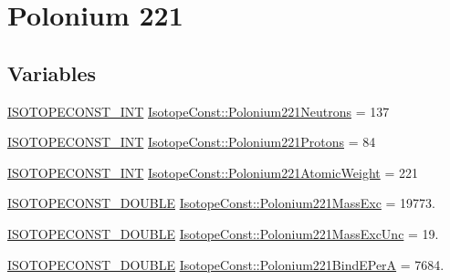 \hypertarget{group___isotope_const-_polonium-_po221}{}\section{Polonium 221}
\label{group___isotope_const-_polonium-_po221}
\subsection*{Variables}
\begin{DoxyCompactItemize}
\item 
\mbox{\hyperlink{group___isotope_const-_macros_ga5f18360b3e99483a35c32d789e62621c}{I\+S\+O\+T\+O\+P\+E\+C\+O\+N\+S\+T\+\_\+\+I\+NT}} \mbox{\hyperlink{group___isotope_const-_polonium-_po221_gae555443e4b4c2704a40b96694425457d}{Isotope\+Const\+::\+Polonium221\+Neutrons}} = 137
\item 
\mbox{\hyperlink{group___isotope_const-_macros_ga5f18360b3e99483a35c32d789e62621c}{I\+S\+O\+T\+O\+P\+E\+C\+O\+N\+S\+T\+\_\+\+I\+NT}} \mbox{\hyperlink{group___isotope_const-_polonium-_po221_gadc16489de263df754e9767a2c19387c1}{Isotope\+Const\+::\+Polonium221\+Protons}} = 84
\item 
\mbox{\hyperlink{group___isotope_const-_macros_ga5f18360b3e99483a35c32d789e62621c}{I\+S\+O\+T\+O\+P\+E\+C\+O\+N\+S\+T\+\_\+\+I\+NT}} \mbox{\hyperlink{group___isotope_const-_polonium-_po221_gaa12ac705a5d815e6845b3fec48907cdb}{Isotope\+Const\+::\+Polonium221\+Atomic\+Weight}} = 221
\item 
\mbox{\hyperlink{group___isotope_const-_macros_ga8f45a7272ce02c0b4c65c44636ed719a}{I\+S\+O\+T\+O\+P\+E\+C\+O\+N\+S\+T\+\_\+\+D\+O\+U\+B\+LE}} \mbox{\hyperlink{group___isotope_const-_polonium-_po221_ga7cd6b4ecf9b2c9cba8928536e73ab5e9}{Isotope\+Const\+::\+Polonium221\+Mass\+Exc}} = 19773.
\item 
\mbox{\hyperlink{group___isotope_const-_macros_ga8f45a7272ce02c0b4c65c44636ed719a}{I\+S\+O\+T\+O\+P\+E\+C\+O\+N\+S\+T\+\_\+\+D\+O\+U\+B\+LE}} \mbox{\hyperlink{group___isotope_const-_polonium-_po221_ga69909bc7dcdcdebc865daf054f4d30b6}{Isotope\+Const\+::\+Polonium221\+Mass\+Exc\+Unc}} = 19.
\item 
\mbox{\hyperlink{group___isotope_const-_macros_ga8f45a7272ce02c0b4c65c44636ed719a}{I\+S\+O\+T\+O\+P\+E\+C\+O\+N\+S\+T\+\_\+\+D\+O\+U\+B\+LE}} \mbox{\hyperlink{group___isotope_const-_polonium-_po221_gace513aa897d186cce21db18a31b88f3d}{Isotope\+Const\+::\+Polonium221\+Bind\+E\+PerA}} = 7684.
\item 

\end{DoxyCompactItemize}

